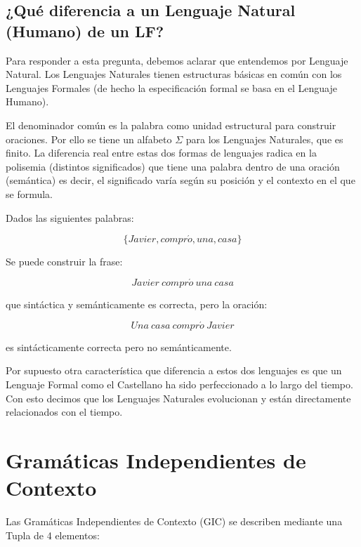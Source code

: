 \subsection{¿Qué diferencia a un Lenguaje Natural (Humano) de un LF?}

Para responder a esta pregunta, debemos aclarar que entendemos por Lenguaje
Natural. Los Lenguajes Naturales tienen estructuras básicas en común con los
Lenguajes Formales (de hecho la especificación formal se basa en el Lenguaje
Humano).

El denominador común es la palabra como unidad estructural para construir
oraciones. Por ello se tiene un alfabeto $\Sigma$ para los Lenguajes Naturales, que es
finito. La diferencia real entre estas dos formas de lenguajes radica en la
polisemia (distintos significados) que tiene una palabra dentro de una oración
(semántica) es decir, el significado varía según su posición y el contexto en el
que se formula.

\ejem Dados las siguientes palabras: 

\begin{equation}
\{Javier,compr\acute{o},una,casa\} 
\end{equation}

Se puede construir la frase:

\begin{equation}
Javier\ compr\acute{o}\ una\ casa 
\end{equation} 

que sintáctica y semánticamente es correcta, pero la oración:

\begin{equation}
Una\ casa\ compr\acute{o}\ Javier 
\end{equation}

es sintácticamente correcta pero no semánticamente.


Por supuesto otra característica que diferencia a estos dos lenguajes es que un
Lenguaje Formal como el Castellano ha sido perfeccionado a lo largo del tiempo.
Con esto decimos que los Lenguajes Naturales evolucionan y están directamente
relacionados con el tiempo.


\section{Gramáticas Independientes de Contexto}

 Las Gramáticas Independientes de Contexto (GIC) se describen mediante una Tupla de 4 elementos:

